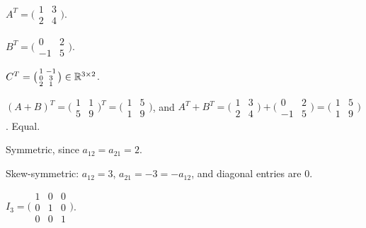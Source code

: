 \begin{solutions}
  \item $A^{T} = \bigl(\begin{smallmatrix} 1 & 3 \\ 2 & 4 \end{smallmatrix}\bigr)$.

  \item $B^{T} = \bigl(\begin{smallmatrix} 0 & 2 \\ -1 & 5 \end{smallmatrix}\bigr)$.

  \item $C^{T} = \bigl(\begin{smallmatrix} 1 & -1 \\ 0 & 3 \\ 2 & 1 \end{smallmatrix}\bigr) \in \mathbb{R}^{3 \times 2}$.

  \item $(A + B)^{T} = \bigl(\begin{smallmatrix} 1 & 1 \\ 5 & 9 \end{smallmatrix}\bigr)^{T} = \bigl(\begin{smallmatrix} 1 & 5 \\ 1 & 9 \end{smallmatrix}\bigr)$, and $A^{T} + B^{T} = \bigl(\begin{smallmatrix} 1 & 3 \\ 2 & 4 \end{smallmatrix}\bigr) + \bigl(\begin{smallmatrix} 0 & 2 \\ -1 & 5 \end{smallmatrix}\bigr) = \bigl(\begin{smallmatrix} 1 & 5 \\ 1 & 9 \end{smallmatrix}\bigr)$. Equal.

  \item Symmetric, since $a_{12} = a_{21} = 2$.

  \item Skew-symmetric: $a_{12} = 3$, $a_{21} = -3 = -a_{12}$, and diagonal entries are $0$.

  \item $I_{3} = \bigl(\begin{smallmatrix} 1 & 0 & 0 \\ 0 & 1 & 0 \\ 0 & 0 & 1 \end{smallmatrix}\bigr)$.


\end{solutions}
